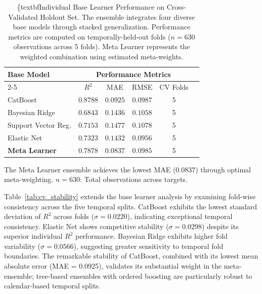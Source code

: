 \documentclass[12pt,a4paper]{article}
\begin{document}
\begin{table}[H]
\centering
\caption{%
    \{textbf{Individual Base Learner Performance on Cross-Validated Holdout Set}.
    The ensemble integrates four diverse base models through stacked generalization.
    Performance metrics are computed on temporally-held-out folds ($n=630$ observations across 5 folds).
    Meta Learner represents the weighted combination using estimated meta-weights.
}
\label{tab:base_learners}
\small
\begin{tabular}{lccccc}
\toprule
\multirow{2}{*}{\textbf{Base Model}} & \multicolumn{4}{c}{\textbf{Performance Metrics}} \\
\cmidrule(lr){2-5}
& $R^2$ & MAE & RMSE & CV Folds \\
\midrule
CatBoost           & $0.8788$ & $0.0925$ & $0.0987$ & 5 \\
Bayesian Ridge     & $0.6843$ & $0.1436$ & $0.1058$ & 5 \\
Support Vector Reg. & $0.7153$ & $0.1477$ & $0.1078$ & 5 \\
Elastic Net        & $0.7323$ & $0.1432$ & $0.0956$ & 5 \\
\midrule
\textbf{Meta Learner} & $\mathbf{0.7878}$ & $\mathbf{0.0837}$ & $\mathbf{0.0985}$ & 5 \\
\bottomrule
\end{tabular}
\begin{flushleft}
\footnotesize
The Meta Learner ensemble achieves the lowest MAE ($0.0837$) through optimal meta-weighting.
$n=630$: Total observations across targets.
\end{flushleft}
\end{table}

\FloatBarrier

Table~\ref{tab:cv_stability} extends the base learner analysis by examining fold-wise consistency across the five temporal splits. CatBoost exhibits the lowest standard deviation of $R^2$ across folds ($\sigma = 0.0220$), indicating exceptional temporal consistency. Elastic Net shows competitive stability ($\sigma = 0.0298$) despite its superior individual $R^2$ performance. Bayesian Ridge exhibits higher fold variability ($\sigma = 0.0566$), suggesting greater sensitivity to temporal fold boundaries. The remarkable stability of CatBoost, combined with its lowest mean absolute error (MAE = 0.0925), validates its substantial weight in the meta-ensemble; tree-based ensembles with ordered boosting are particularly robust to calendar-based temporal splits.
\end{document}

